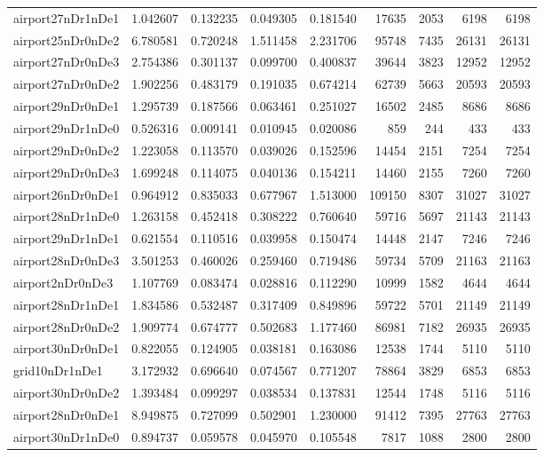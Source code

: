 \documentclass[../../../thesis.tex]{subfiles}
\begin{document}
\begin{longtable}{|l|r|r|r|r|r|r|r|r|}
airport27nDr1nDe1 & 1.042607 & 0.132235 & 0.049305 & 0.181540 & 17635 & 2053 & 6198 & 6198 \\
airport25nDr0nDe2 & 6.780581 & 0.720248 & 1.511458 & 2.231706 & 95748 & 7435 & 26131 & 26131 \\
airport27nDr0nDe3 & 2.754386 & 0.301137 & 0.099700 & 0.400837 & 39644 & 3823 & 12952 & 12952 \\
airport27nDr0nDe2 & 1.902256 & 0.483179 & 0.191035 & 0.674214 & 62739 & 5663 & 20593 & 20593 \\
airport29nDr0nDe1 & 1.295739 & 0.187566 & 0.063461 & 0.251027 & 16502 & 2485 & 8686 & 8686 \\
airport29nDr1nDe0 & 0.526316 & 0.009141 & 0.010945 & 0.020086 & 859 & 244 & 433 & 433 \\
airport29nDr0nDe2 & 1.223058 & 0.113570 & 0.039026 & 0.152596 & 14454 & 2151 & 7254 & 7254 \\
airport29nDr0nDe3 & 1.699248 & 0.114075 & 0.040136 & 0.154211 & 14460 & 2155 & 7260 & 7260 \\
airport26nDr0nDe1 & 0.964912 & 0.835033 & 0.677967 & 1.513000 & 109150 & 8307 & 31027 & 31027 \\
airport28nDr1nDe0 & 1.263158 & 0.452418 & 0.308222 & 0.760640 & 59716 & 5697 & 21143 & 21143 \\
airport29nDr1nDe1 & 0.621554 & 0.110516 & 0.039958 & 0.150474 & 14448 & 2147 & 7246 & 7246 \\
airport28nDr0nDe3 & 3.501253 & 0.460026 & 0.259460 & 0.719486 & 59734 & 5709 & 21163 & 21163 \\
airport2nDr0nDe3 & 1.107769 & 0.083474 & 0.028816 & 0.112290 & 10999 & 1582 & 4644 & 4644 \\
airport28nDr1nDe1 & 1.834586 & 0.532487 & 0.317409 & 0.849896 & 59722 & 5701 & 21149 & 21149 \\
airport28nDr0nDe2 & 1.909774 & 0.674777 & 0.502683 & 1.177460 & 86981 & 7182 & 26935 & 26935 \\
airport30nDr0nDe1 & 0.822055 & 0.124905 & 0.038181 & 0.163086 & 12538 & 1744 & 5110 & 5110 \\
grid10nDr1nDe1 & 3.172932 & 0.696640 & 0.074567 & 0.771207 & 78864 & 3829 & 6853 & 6853 \\
airport30nDr0nDe2 & 1.393484 & 0.099297 & 0.038534 & 0.137831 & 12544 & 1748 & 5116 & 5116 \\
airport28nDr0nDe1 & 8.949875 & 0.727099 & 0.502901 & 1.230000 & 91412 & 7395 & 27763 & 27763 \\
airport30nDr1nDe0 & 0.894737 & 0.059578 & 0.045970 & 0.105548 & 7817 & 1088 & 2800 & 2800 \\

\end{longtable}
\end{document}
